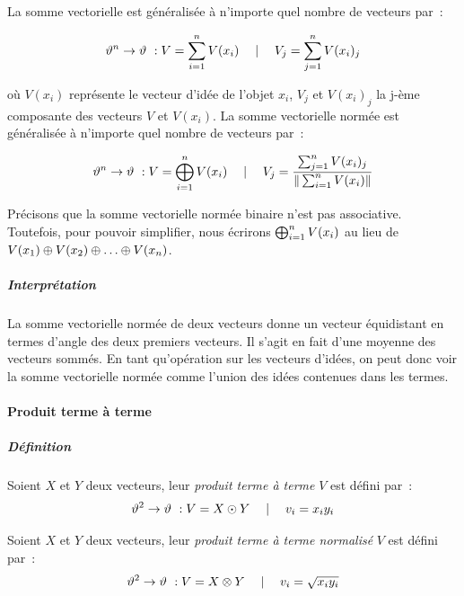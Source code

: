 {La somme vectorielle est généralisée à n'importe quel nombre de
vecteurs par~:

\begin{equation}
\vartheta^{n} \rightarrow \vartheta~: V =\sum^{n}_{i=1} V(x_i) \quad \mid
\quad V_j = \sum_{j=1}^{n} V(x_i)_j
\end{equation}

où $V(x_i)$ représente le vecteur d'idée de l'objet $x_i$, $V_j$ et
$V(x_i)_j$ la j-ème composante des vecteurs $V$ et $V(x_i)$. La somme
vectorielle normée est généralisée à n'importe quel nombre de vecteurs
par~:

\begin{equation}
\vartheta^{n} \rightarrow \vartheta~: V=\bigoplus^{n}_{i=1} V(x_i) \quad \mid \quad V_j=\frac{\sum_{j=1}^{n} V(x_i)_j}{\|\sum^{n}_{i=1} V(x_i)\|}
\end{equation}


Précisons que la somme vectorielle normée binaire n'est pas associative. Toutefois,
pour pouvoir simplifier, nous écrirons
%
$\bigoplus^{n}_{i=1} V(x_i)$ au lieu de $ V(x_1) \oplus V(x_2)
\oplus \ldots \oplus V(x_n)$.

\subparagraph{Interprétation}

La somme vectorielle normée de deux vecteurs donne un vecteur
équidistant en termes d'angle des deux premiers vecteurs. Il s'agit en
fait d'une moyenne des vecteurs sommés. En tant qu'opération sur les
vecteurs d'idées, on peut donc voir la somme
vectorielle normée comme l'union des idées contenues dans les termes.

\paragraph{Produit terme à terme}\label{sec:produit-terme-terme}

\subparagraph{Définition}
Soient $X$ et $Y$ deux vecteurs, leur \emph{produit terme à terme} $V$
est défini par~:
\begin{equation}
\vartheta^{2} \rightarrow \vartheta~: V = X \odot Y \quad  \mid \quad  v_{i} = x_iy_i
\end{equation}

Soient $X$ et $Y$ deux vecteurs, leur \emph{produit terme à terme
  normalisé} $V$ est défini par~:
\begin{equation}
\vartheta^{2} \rightarrow \vartheta~: V = X \otimes Y \quad  \mid \quad  v_{i} = \sqrt{x_iy_i}
\end{equation}

}
